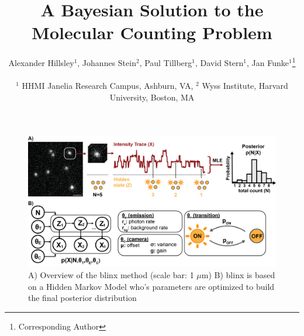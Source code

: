 \documentclass[twocolumn]{article}
\begin{document}
\title{A Bayesian Solution to the Molecular Counting Problem}

\author{
  Alexander Hillsley$^{1}$,
  Johannes Stein$^{2}$,
  Paul Tillberg$^{1}$,
  David Stern$^{1}$,
  Jan Funke$^{1}$\thanks{Corresponding Author}
  \\\\
  \normalsize{$^1$ HHMI Janelia Research Campus, Ashburn, VA},
  \normalsize{$^2$ Wyss Institute, Harvard University, Boston, MA}
}

\maketitle

\begin{figure}
  \includegraphics[width=\linewidth]{figures/placeholders/figure_1_overview.png}
  \caption{A) Overview of the blinx method (scale bar: 1 $\mu$m) B) blinx is based on a Hidden Markov Model who's parameters are optimized to build the final posterior
  distribution}
  \label{fig:method:overview}
\end{figure}
\end{document}
